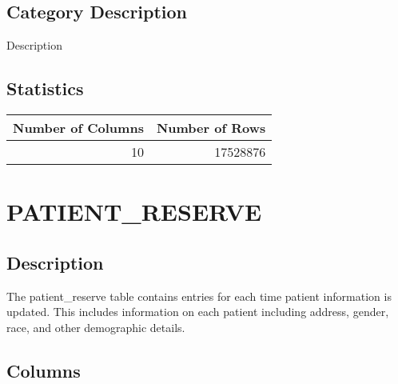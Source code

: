 \documentclass[
  letterpaper,
  DIV=11,
  numbers=noendperiod]{scrreprt}
\begin{document}
\hypertarget{category-description-28}{%
\section*{Category Description}\label{category-description-28}}

Description

\hypertarget{statistics-28}{%
\section*{Statistics}\label{statistics-28}}

\begin{longtable}{rr}
\toprule
Number of Columns & Number of Rows \\ 
\midrule
10 & 17528876 \\ 
\bottomrule
\end{longtable}

\hypertarget{patient_reserve}{%
\chapter*{PATIENT\_RESERVE}\label{patient_reserve}}

\hypertarget{description-29}{%
\section*{Description}\label{description-29}}

The patient\_reserve table contains entries for each time patient
information is updated. This includes information on each patient
including address, gender, race, and other demographic details.

\hypertarget{columns-29}{%
\section*{Columns}\label{columns-29}}
\end{document}
